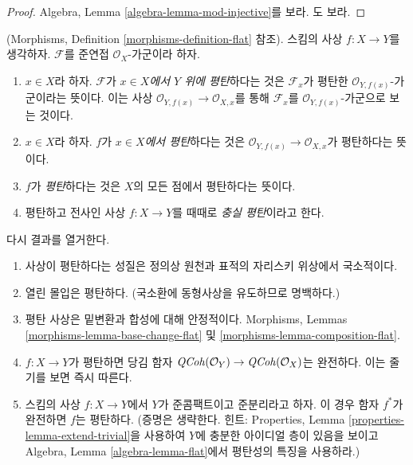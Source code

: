 \begin{proof}
Algebra, Lemma \ref{algebra-lemma-mod-injective}를 보라.
\cite[Section 20]{MatCA}도 보라.
\end{proof}

\begin{definition}
\label{definition-flat-schemes}
(Morphisms, Definition \ref{morphisms-definition-flat} 참조).
스킴의 사상 $f : X \to Y$를 생각하자.
$\mathcal{F}$를 준연접 $\mathcal{O}_X$-가군이라 하자.
\begin{enumerate}
\item $x \in X$라 하자. $\mathcal{F}$가
{\it $x \in X$에서 $Y$ 위에 평탄}하다는 것은
$\mathcal{F}_x$가 평탄한 $\mathcal{O}_{Y, f(x)}$-가군이라는 뜻이다.
이는 사상 $\mathcal{O}_{Y, f(x)} \to \mathcal{O}_{X, x}$를 통해
$\mathcal{F}_x$를 $\mathcal{O}_{Y, f(x)}$-가군으로 보는 것이다.
\item $x \in X$라 하자. $f$가 {\it $x \in X$에서 평탄}하다는 것은
$\mathcal{O}_{Y, f(x)} \to \mathcal{O}_{X, x}$가 평탄하다는 뜻이다.
\item $f$가 {\it 평탄}하다는 것은 $X$의 모든 점에서 평탄하다는 뜻이다.
\item 평탄하고 전사인 사상 $f : X \to Y$를 때때로
{\it 충실 평탄}이라고 한다.
\end{enumerate}
\end{definition}

\noindent
다시 결과를 열거한다.
\begin{enumerate}
\item 사상이 평탄하다는 성질은 정의상 원천과 표적의 자리스키 위상에서
국소적이다.
\item 열린 몰입은 평탄하다. (국소환에 동형사상을 유도하므로 명백하다.)
\item 평탄 사상은 밑변환과 합성에 대해 안정적이다.
Morphisms, Lemmas \ref{morphisms-lemma-base-change-flat} 및
\ref{morphisms-lemma-composition-flat}.
\item $f : X \to Y$가 평탄하면 당김 함자
$\mathit{QCoh}(\mathcal{O}_Y) \to \mathit{QCoh}(\mathcal{O}_X)$는 완전하다.
이는 줄기를 보면 즉시 따른다.
\item 스킴의 사상 $f : X \to Y$에서 $Y$가 준콤팩트이고
준분리라고 하자. 이 경우 함자 $f^*$가 완전하면 $f$는 평탄하다.
(증명은 생략한다. 힌트: Properties, Lemma
\ref{properties-lemma-extend-trivial}을 사용하여 $Y$에 충분한
아이디얼 층이 있음을 보이고 Algebra, Lemma
\ref{algebra-lemma-flat}에서 평탄성의 특징을 사용하라.)
\end{enumerate}



